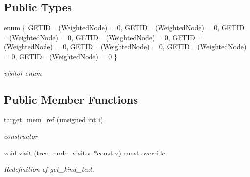 \subsection*{Public Types}
\begin{DoxyCompactItemize}
\item 
enum \{ \newline
\hyperlink{structtarget__mem__ref_aa8e359386da90822485e77b6500859cca2db37b4dd9a0d8803a12636528030346}{G\+E\+T\+ID} =(Weighted\+Node) = 0, 
\hyperlink{structtarget__mem__ref_aa8e359386da90822485e77b6500859cca2db37b4dd9a0d8803a12636528030346}{G\+E\+T\+ID} =(Weighted\+Node) = 0, 
\hyperlink{structtarget__mem__ref_aa8e359386da90822485e77b6500859cca2db37b4dd9a0d8803a12636528030346}{G\+E\+T\+ID} =(Weighted\+Node) = 0, 
\hyperlink{structtarget__mem__ref_aa8e359386da90822485e77b6500859cca2db37b4dd9a0d8803a12636528030346}{G\+E\+T\+ID} =(Weighted\+Node) = 0, 
\newline
\hyperlink{structtarget__mem__ref_aa8e359386da90822485e77b6500859cca2db37b4dd9a0d8803a12636528030346}{G\+E\+T\+ID} =(Weighted\+Node) = 0, 
\hyperlink{structtarget__mem__ref_aa8e359386da90822485e77b6500859cca2db37b4dd9a0d8803a12636528030346}{G\+E\+T\+ID} =(Weighted\+Node) = 0, 
\hyperlink{structtarget__mem__ref_aa8e359386da90822485e77b6500859cca2db37b4dd9a0d8803a12636528030346}{G\+E\+T\+ID} =(Weighted\+Node) = 0, 
\hyperlink{structtarget__mem__ref_aa8e359386da90822485e77b6500859cca2db37b4dd9a0d8803a12636528030346}{G\+E\+T\+ID} =(Weighted\+Node) = 0
 \}\begin{DoxyCompactList}\small\item\em visitor enum \end{DoxyCompactList}
\end{DoxyCompactItemize}
\subsection*{Public Member Functions}
\begin{DoxyCompactItemize}
\item 
\hyperlink{structtarget__mem__ref_ae3248fb7f5dc29187297fca47c51adb6}{target\+\_\+mem\+\_\+ref} (unsigned int i)
\begin{DoxyCompactList}\small\item\em constructor \end{DoxyCompactList}\item 
void \hyperlink{structtarget__mem__ref_ab40ad4b7dc4e392c397a4cfcacbc46e1}{visit} (\hyperlink{classtree__node__visitor}{tree\+\_\+node\+\_\+visitor} $\ast$const v) const override
\begin{DoxyCompactList}\small\item\em Redefinition of get\+\_\+kind\+\_\+text. \end{DoxyCompactList}\end{DoxyCompactItemize}
